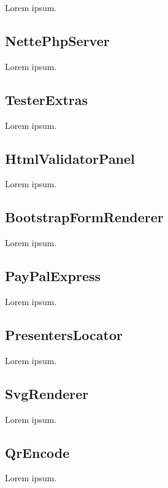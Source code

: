 Lorem ipsum.

\subsection{NettePhpServer} \label{sec:state:nette-php-server}

Lorem ipsum.

\subsection{TesterExtras} \label{sec:state:tester-extras}

Lorem ipsum.

\subsection{HtmlValidatorPanel} \label{sec:state:html-validator-panel}

Lorem ipsum.

\subsection{BootstrapFormRenderer} \label{sec:state:bootstrap-form-renderer}

Lorem ipsum.

\subsection{PayPalExpress} \label{sec:state:paypal-express}

Lorem ipsum.

\subsection{PresentersLocator} \label{sec:state:presenters-locator}

Lorem ipsum.

\subsection{SvgRenderer} \label{sec:state:svg-renderer}

Lorem ipsum.

\subsection{QrEncode} \label{sec:state:qr-encode}

Lorem ipsum.